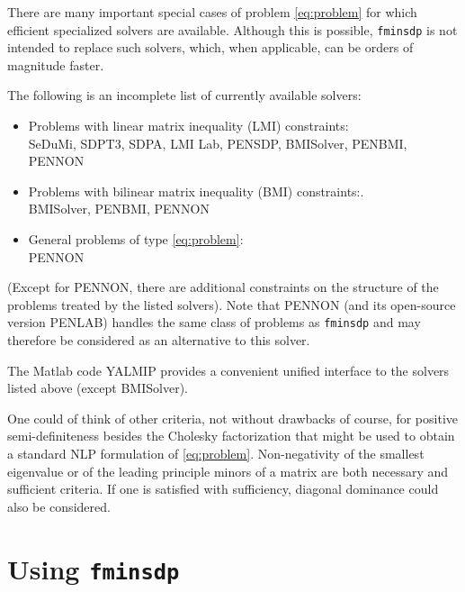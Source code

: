 \documentclass{article}
\begin{document}
There are many important special cases of problem \eqref{eq:problem} for which efficient specialized solvers 
are available. Although this is possible, \texttt{fminsdp} is not intended to replace such solvers, which, 
when applicable, can be orders of magnitude faster.

The following is an incomplete list of currently available solvers:
\begin{itemize}
\item Problems with linear matrix inequality (LMI) constraints:\\
\hskip2mm SeDuMi, SDPT3, SDPA, LMI Lab, PENSDP, BMISolver, PENBMI, PENNON
\item Problems with bilinear matrix inequality (BMI) constraints:.\\
\hskip2mm BMISolver, PENBMI, PENNON
\item General problems of type \eqref{eq:problem}:\\
\hskip2mm PENNON
\end{itemize}
(Except for PENNON, there are additional constraints on the structure of the problems treated by the listed solvers). Note that PENNON \cite{Kocvara:2003} (and its open-source version PENLAB) handles the same class of problems as \texttt{fminsdp} and may therefore be considered as an alternative to this solver.

The Matlab code YALMIP \cite{Yalmip:2004} provides a convenient unified interface to the solvers listed above (except BMISolver).

One could of think of other criteria, not without drawbacks of course, for positive semi-definiteness besides the Cholesky factorization that might
be used to obtain a standard NLP formulation of \eqref{eq:problem}. Non-negativity of the smallest eigenvalue or of the leading principle minors of a matrix are both necessary and sufficient criteria. If one is satisfied with sufficiency, diagonal dominance could also be considered.





\section{Using \texttt{fminsdp}}
\label{sec:using}
\end{document}
